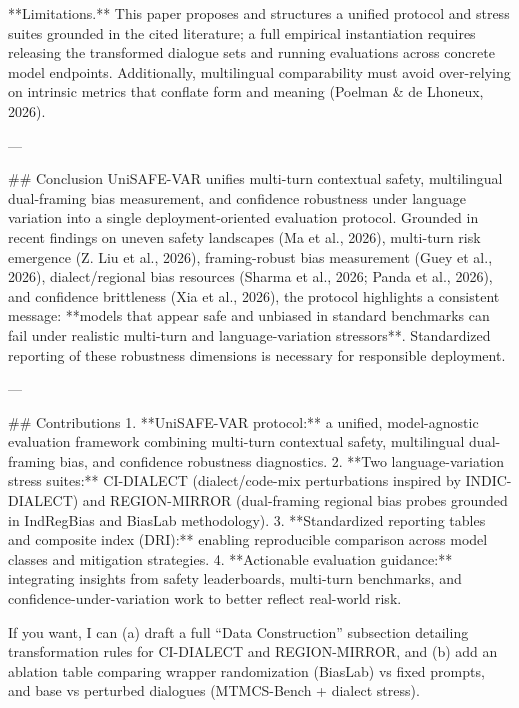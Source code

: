 **Limitations.** This paper proposes and structures a unified protocol and stress suites grounded in the cited literature; a full empirical instantiation requires releasing the transformed dialogue sets and running evaluations across concrete model endpoints. Additionally, multilingual comparability must avoid over-relying on intrinsic metrics that conflate form and meaning (Poelman & de Lhoneux, 2026).

---

## Conclusion  
UniSAFE-VAR unifies multi-turn contextual safety, multilingual dual-framing bias measurement, and confidence robustness under language variation into a single deployment-oriented evaluation protocol. Grounded in recent findings on uneven safety landscapes (Ma et al., 2026), multi-turn risk emergence (Z. Liu et al., 2026), framing-robust bias measurement (Guey et al., 2026), dialect/regional bias resources (Sharma et al., 2026; Panda et al., 2026), and confidence brittleness (Xia et al., 2026), the protocol highlights a consistent message: **models that appear safe and unbiased in standard benchmarks can fail under realistic multi-turn and language-variation stressors**. Standardized reporting of these robustness dimensions is necessary for responsible deployment.

---

## Contributions  
1. **UniSAFE-VAR protocol:** a unified, model-agnostic evaluation framework combining multi-turn contextual safety, multilingual dual-framing bias, and confidence robustness diagnostics.  
2. **Two language-variation stress suites:** CI-DIALECT (dialect/code-mix perturbations inspired by INDIC-DIALECT) and REGION-MIRROR (dual-framing regional bias probes grounded in IndRegBias and BiasLab methodology).  
3. **Standardized reporting tables and composite index (DRI):** enabling reproducible comparison across model classes and mitigation strategies.  
4. **Actionable evaluation guidance:** integrating insights from safety leaderboards, multi-turn benchmarks, and confidence-under-variation work to better reflect real-world risk.

If you want, I can (a) draft a full “Data Construction” subsection detailing transformation rules for CI-DIALECT and REGION-MIRROR, and (b) add an ablation table comparing wrapper randomization (BiasLab) vs fixed prompts, and base vs perturbed dialogues (MTMCS-Bench + dialect stress).